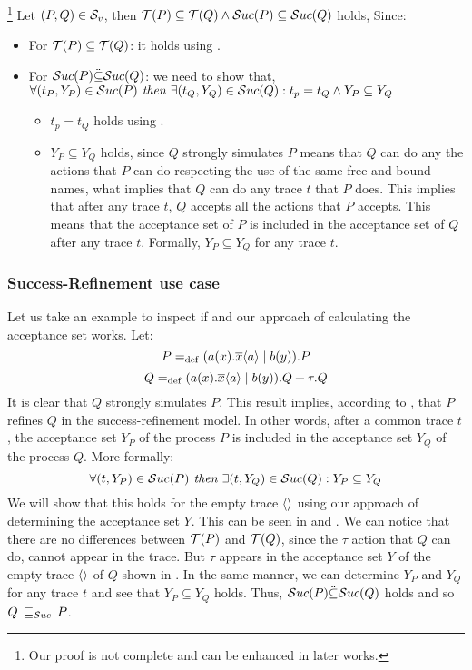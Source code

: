 \begin{prf}\footnote{Our proof is not complete and can be enhanced in later works.}
Let $(P,Q)\in{}\mathcal{S}_v$, then $\Traces[P]\subseteq\Traces[Q] \wedge \Successes[P]\subseteq\Successes[Q]$ holds, Since:
\begin{itemize}
\item For $\Traces[P]\subseteq\Traces[Q]$: it holds using .
\item For $\Successes[P]\ddot{\subseteq}\Successes[Q]$: we need to show that,\\$\forall (t_P, Y_P) \in \Successes[P] \textit{ then } \exists (t_Q, Y_Q) \in \Successes[Q]: t_p = t_Q \wedge Y_P \subseteq Y_Q$
\begin{itemize}
\item $t_p = t_Q$ holds using .
\item $Y_P \subseteq Y_Q$ holds, since $Q$ strongly simulates $P$ means that $Q$ can do any the actions that $P$ can do respecting the use of the same free and bound names, what implies that $Q$ can do any trace $t$ that $P$ does. This implies that after any trace $t$, $Q$ accepts all the actions that $P$ accepts. This means that the acceptance set of $P$ is included in the acceptance set of $Q$ after any trace $t$. Formally, $Y_P \subseteq Y_Q$ for any trace $t$.
\end{itemize}
\end{itemize}
\end{prf}
\subsubsection{Success-Refinement use case}
Let us take an example to inspect if  and our approach of calculating the acceptance set works. Let:\\
\[P=_{\mathrm{def}}(a(x).\overline{x}\langle a\rangle \mid b(y)).P\]  
\[Q=_{\mathrm{def}}(a(x).\overline{x}\langle a\rangle \mid b(y)).Q + \tau.Q\]
It is clear that $Q$ strongly simulates $P$. This result implies, according to , that $P$ refines $Q$ in the success-refinement model. In other words, after a common trace $t$, the acceptance set $Y_P$ of the process $P$ is included in the acceptance set $Y_Q$ of the process $Q$. More formally:
\[\forall (t, Y_P) \in \Successes[P] \textit{ then } \exists (t, Y_Q) \in \Successes[Q]: Y_P \subseteq Y_Q\]
We will show that this holds for the empty trace $\overline{}\langle\rangle$ using our approach of determining the acceptance set $Y$.
This can be seen in  and . We can notice that there are no differences between $\Traces[P]$ and $\Traces[Q]$, since the $\tau$ action that $Q$ can do, cannot appear in the trace. But $\tau$ appears in the acceptance set $Y$ of the empty trace $\overline{}\langle\rangle$ of $Q$ shown in . In the same manner, we can determine $Y_P$ and $Y_Q$ for any trace $t$ and see that $Y_P \subseteq Y_Q$ holds. Thus, $\Successes[P]\ddot{\subseteq}\Successes[Q]$ holds and so $Q \refiSuc P$.

